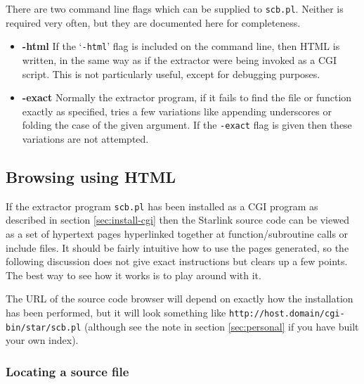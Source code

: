 \documentclass[twoside,11pt]{article}
\newcommand{\xlabel}[1]{}
\renewcommand{\_}{\texttt{\symbol{95}}}
\begin{document}
There are two command line flags which can be supplied to {\tt scb.pl}.
Neither is required very often, but they are documented here for completeness.
\begin{itemize}
\item {\bf -html}
If the `{\tt -html}' flag is included on the command line, 
then HTML is written, in the same way as if the extractor were
being invoked as a CGI script.  This is not particularly useful,
except for debugging purposes.
\item {\bf -exact}
Normally the extractor program, if it fails to find the file or
function exactly as specified, tries a few variations like appending
underscores or folding the case of the given argument.
If the {\tt -exact} flag is given then these variations are not attempted.
\end{itemize}




\subsection{\xlabel{sec:extract-cgi}Browsing using HTML}

If the extractor program {\tt scb.pl} has been installed
as a CGI program as described in section \ref{sec:install-cgi}
then the Starlink source code can be viewed as a set of 
hypertext pages hyperlinked together 
at function/subroutine calls or include files.
It should be fairly intuitive how to use the pages generated,
so the following discussion does not give exact instructions
but clears up a few points.
The best way to see how it works is to play around with it.

The URL of the source code browser will depend on exactly how
the installation has been performed, but it will look something
like {\tt http://host.domain/cgi-bin/star/scb.pl} 
(although see the note in section \ref{sec:personal} 
if you have built your own index).


\subsubsection{Locating a source file}
\xlabel{BROWSER-HELP} 
\end{document}
